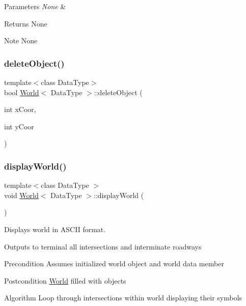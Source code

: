 \begin{DoxyParams}{Parameters}
{\em None} & \\
\hline
\end{DoxyParams}
\begin{DoxyReturn}{Returns}
None
\end{DoxyReturn}
\begin{DoxyNote}{Note}
None 
\end{DoxyNote}
\hypertarget{class_world_ac81c2e5154a59fa6545825aa55905619}{}\label{class_world_ac81c2e5154a59fa6545825aa55905619} 
\subsubsection{\texorpdfstring{delete\+Object()}{deleteObject()}}
{\footnotesize\ttfamily template$<$class Data\+Type$>$ \\
bool \hyperlink{class_world}{World}$<$ Data\+Type $>$\+::delete\+Object (\begin{DoxyParamCaption}\item[{int}]{x\+Coor,  }\item[{int}]{y\+Coor }\end{DoxyParamCaption})}

\hypertarget{class_world_a5a8087d89f416b83dd42d5bf961fb640}{}\label{class_world_a5a8087d89f416b83dd42d5bf961fb640} 
\subsubsection{\texorpdfstring{display\+World()}{displayWorld()}}
{\footnotesize\ttfamily template$<$class Data\+Type $>$ \\
void \hyperlink{class_world}{World}$<$ Data\+Type $>$\+::display\+World (\begin{DoxyParamCaption}{ }\end{DoxyParamCaption})}



Displays world in A\+S\+C\+II format. 

Outputs to terminal all intersections and interminate roadways

\begin{DoxyPrecond}{Precondition}
Assumes initialized world object and world data member
\end{DoxyPrecond}
\begin{DoxyPostcond}{Postcondition}
\hyperlink{class_world}{World} filled with objects
\end{DoxyPostcond}
\begin{DoxyParagraph}{Algorithm}
Loop through intersections within world displaying their symbols
\end{DoxyParagraph}

